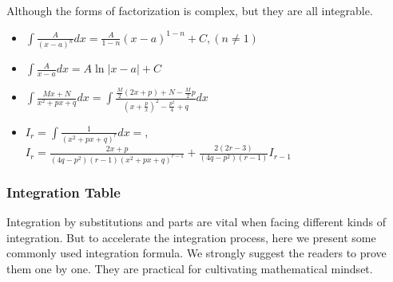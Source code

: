\documentclass[oneside]{book}
\begin{document}
Although the forms of factorization is complex, but they are all integrable.

\begin{itemize}
    \item $\int \frac{A}{(x-a)^n} dx = \frac{A}{1-n} (x-a)^{1-n} +C,(n \neq 1)$
    \item $\int \frac{A}{x-a} dx = A \ln|x-a| + C$
    \item $\int \frac{Mx+N}{x^2 + px + q} dx = \int \frac{\frac{M}{2} (2x+p) + N - \frac{M}{2} p}{(x+\frac{p}{x})^2 - \frac{p^2}{4} + q} dx$
    \item $I_r = \int \frac{1}{(x^2 + px + q)^r} dx = $, $I_r = \frac{2x + p}{(4q - p^2)(r-1)(x^2 + px + q)^{r-1}} + \frac{2(2r-3)}{(4q - p^2)(r-1)} I_{r-1}$
\end{itemize}



\subsubsection{Integration Table}

Integration by substitutions and parts are vital when facing different kinds of integration. But to accelerate the integration process, here we present some commonly used integration formula. We strongly suggest the readers to prove them one by one. They are practical for cultivating mathematical mindset.
\end{document}
